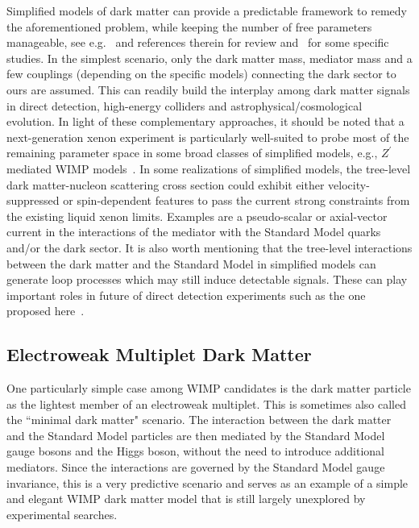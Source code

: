 Simplified models of dark matter can provide a predictable framework to remedy the aforementioned problem, while keeping the number of free parameters manageable, see e.g.~\cite{Hisano:2015bma, DeSimone:2016fbz,Abdallah:2015ter,DiFranzo:2013vra,Abercrombie:2015wmb} and references therein for review and~\cite{Arina:2014yna,Hisano:2018bpz,Balazs:2017hxh, Jacques:2016dqz,Buckley:2014fba,Berlin:2014tja} for some specific studies. In the simplest scenario, only the dark matter mass, mediator mass and a few couplings (depending on the specific models) connecting the dark sector to ours are assumed. This can readily build the interplay among dark matter signals in direct detection, high-energy colliders and astrophysical/cosmological evolution. In light of these complementary approaches, it should be noted that a next-generation xenon experiment is particularly well-suited to probe most of the remaining parameter space in some broad classes of simplified models, e.g., $Z^\prime$ mediated WIMP models~\cite{Blanco:2019hah}. In some realizations of simplified models, the tree-level dark matter-nucleon scattering cross section could exhibit either velocity-suppressed or spin-dependent features to pass the current strong constraints from the existing liquid xenon limits. Examples are a pseudo-scalar or axial-vector current in the interactions of the mediator with the Standard Model quarks and/or the dark sector. It is also worth mentioning that the tree-level interactions between the dark matter and the Standard Model in simplified models can generate loop processes which may still induce detectable signals. These can play important roles in future of direct detection experiments such as the one proposed here~\cite{Drees:1993bu, Hisano:2010ct, Baek:2016lnv, Baek:2017ykw, Arcadi:2017wqi, Li:2018qip,Abe:2018emu, Li:2019fnn,Mohan:2019zrk, Ertas:2019dew, Giacchino:2015hvk, Giacchino:2014moa, Ibarra:2014qma, Colucci:2018vxz, Colucci:2018qml, Chao:2019lhb,LaFontaine:2021cin}.

\subsection{Electroweak Multiplet Dark Matter}

One particularly simple case among WIMP candidates is the dark matter particle as the lightest member of an electroweak multiplet. This is sometimes also called the ``minimal dark matter" scenario\cite{Cirelli:2005uq,Cirelli:2009uv,DiLuzio:2018jwd}. The interaction between the dark matter and the Standard Model particles are then mediated by the Standard Model gauge bosons and the Higgs boson, without the need to introduce additional mediators. Since the interactions are governed by the Standard Model gauge invariance, this is a very predictive scenario and serves as an example of a simple and elegant WIMP dark matter model that is still largely unexplored by experimental searches. 

